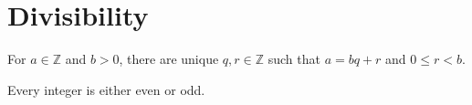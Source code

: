 \documentclass{article}
\begin{document}
\section{Divisibility}
\begin{theorem}\label{thm:division}
For $a\in\mathbb Z$ and $b>0$, there are unique $q,r\in\mathbb Z$ such that
$a=bq+r$ and $0\le r<b$.
\end{theorem}
\begin{corollary}
Every integer is either even or odd.
\end{corollary}
\end{document}
